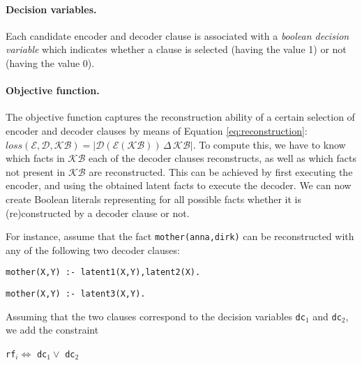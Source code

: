 \paragraph{Decision variables.}
Each candidate encoder and decoder clause is associated with a \textit{boolean decision variable} which indicates whether a clause is selected (having the value 1) or not (having the value 0).


\paragraph{Objective function.}
The objective function captures the reconstruction ability of a certain selection of encoder and decoder clauses by means of Equation \ref{eq:reconstruction}: $loss(\mathcal{E},\mathcal{D},\mathcal{KB}) = | \mathcal{D}(\mathcal{E}(\mathcal{KB})) \, \Delta \, \mathcal{KB} |$.
To compute this, we have to know which facts in $\mathcal{KB}$ each of the decoder clauses reconstructs, as well as which facts not present in $\mathcal{KB}$ are reconstructed.
This can be achieved by first executing the encoder, and using the obtained latent facts to execute the decoder.
We can now create Boolean literals representing for all possible facts whether it is (re)constructed by a decoder clause or not.

For instance, assume that the fact \texttt{mother(anna,dirk)} can be reconstructed with any of the following two decoder clauses:
\begin{center}
	\texttt{mother(X,Y) :- latent1(X,Y),latent2(X).}

	 \texttt{mother(X,Y) :- latent3(X,Y).}
\end{center}

Assuming that the two clauses correspond to the decision variables \texttt{dc}$_1$ and \texttt{dc}$_2$, we add the constraint %

\begin{center}
\texttt{rf}$_i \Leftrightarrow$  \texttt{dc}$_1  \vee $ \texttt{dc}$_2$
\end{center}

